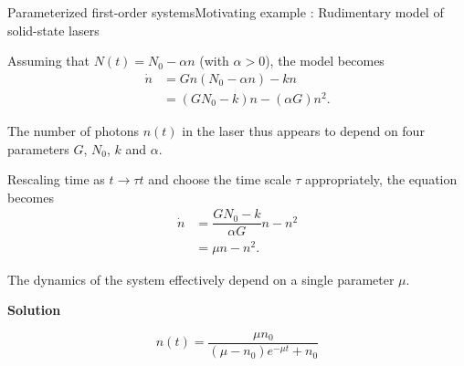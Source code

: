 \documentclass[usenames,dvipsnames,svgnames,10pt,aspectratio=169]{beamer}
\begin{document}
\begin{frame}[t, c]{Parameterized first-order systems}{Motivating example : Rudimentary model of solid-state lasers}
  \begin{minipage}{.58\textwidth}
    \begin{overprint}
      Assuming that $N(t) = N_0 - \alpha n$ (with $\alpha > 0$), the model becomes
      \[
      \begin{aligned}
        \dot{n} & = Gn(N_0 - \alpha n) - kn \\
        & = (GN_0 - k) n - (\alpha G) n^2.
      \end{aligned}
      \]
      
      \medskip
      
      The number of photons $n(t)$ in the laser thus appears to depend on four parameters $G$, $N_0$, $k$ and $\alpha$.

      Rescaling time as $t \to \tau t$ and choose the time scale $\tau$ appropriately, the equation becomes
      \[
      \begin{aligned}
        \dot{n} & = \dfrac{G N_0 - k}{\alpha G} n - n^2 \\
        & = \mu n - n^2.
      \end{aligned}
      \]

      The dynamics of the system effectively depend on a single parameter $\mu$.
    \end{overprint}
  \end{minipage}%
  \hfill
  \begin{minipage}{.38\textwidth}
    \begin{overprint}
      \centering
      \textbf{Solution}

      \[n(t) = \dfrac{\mu n_0}{(\mu - n_0) e^{-\mu t} + n_0} \]
    \end{overprint}
  \end{minipage}

\end{frame}
\end{document}
